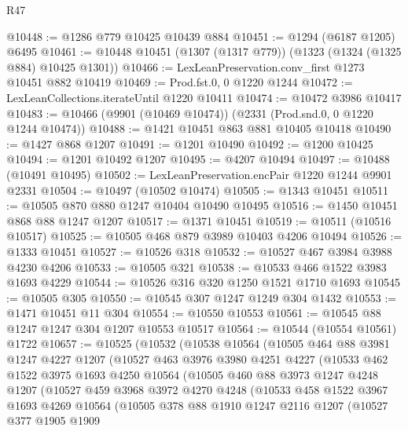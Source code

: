 \begin{lexlean}{R47}
\begin{coremodule}
@10448 := @1286 @779 @10425 @10439 @884
@10451 := @1294 (@6187 @1205) @6495
@10461 := @10448 @10451 (@1307 (@1317 @779)) (@1323 (@1324 (@1325 @884) @10425 @1301))
@10466 := LexLeanPreservation.conv_first @1273 @10451 @882 @10419
@10469 := Prod.fst.{0, 0} @1220 @1244
@10472 := LexLeanCollections.iterateUntil @1220 @10411
@10474 := @10472 @3986 @10417
@10483 := @10466 (@9901 (@10469 @10474)) (@2331 (Prod.snd.{0, 0} @1220 @1244 @10474))
@10488 := @1421 @10451 @863 @881 @10405 @10418
@10490 := @1427 @868 @1207
@10491 := @1201 @10490
@10492 := @1200 @10425
@10494 := @1201 @10492 @1207
@10495 := @4207 @10494
@10497 := @10488 (@10491 @10495)
@10502 := LexLeanPreservation.encPair @1220 @1244 @9901 @2331
@10504 := @10497 (@10502 @10474)
@10505 := @1343 @10451
@10511 := @10505 @870 @880 @1247 @10404 @10490 @10495
@10516 := @1450 @10451 @868 @88 @1247 @1207
@10517 := @1371 @10451
@10519 := @10511 (@10516 @10517)
@10525 := @10505 @468 @879 @3989 @10403 @4206 @10494
@10526 := @1333 @10451
@10527 := @10526 @318
@10532 := @10527 @467 @3984 @3988 @4230 @4206
@10533 := @10505 @321
@10538 := @10533 @466 @1522 @3983 @1693 @4229
@10544 := @10526 @316 @320 @1250 @1521 @1710 @1693
@10545 := @10505 @305
@10550 := @10545 @307 @1247 @1249 @304 @1432
@10553 := @1471 @10451 @11 @304
@10554 := @10550 @10553
@10561 := @10545 @88 @1247 @1247 @304 @1207 @10553 @10517
@10564 := @10544 (@10554 @10561) @1722
@10657 := @10525
    (@10532
      (@10538
        @10564
        (@10505
          @464
          @88
          @3981
          @1247
          @4227
          @1207
          (@10527
            @463
            @3976
            @3980
            @4251
            @4227
            (@10533
              @462
              @1522
              @3975
              @1693
              @4250
              @10564
              (@10505
                @460
                @88
                @3973
                @1247
                @4248
                @1207
                (@10527
                  @459
                  @3968
                  @3972
                  @4270
                  @4248
                  (@10533
                    @458
                    @1522
                    @3967
                    @1693
                    @4269
                    @10564
                    (@10505
                      @378
                      @88
                      @1910
                      @1247
                      @2116
                      @1207
                      (@10527
                        @377
                        @1905
                        @1909

\end{coremodule}
\end{lexlean}
